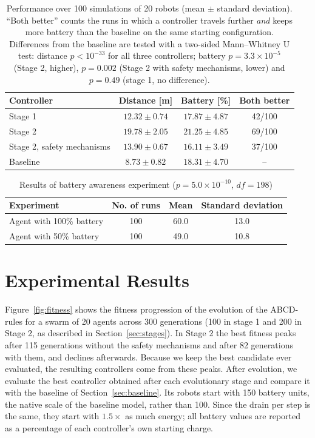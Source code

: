\documentclass[runningheads]{llncs}
\begin{document}
\begin{table}[t]
\centering
\caption{Performance over 100 simulations of 20 robots (mean $\pm$ standard deviation). ``Both better'' counts the runs in which a controller travels further \emph{and} keeps more battery than the baseline on the same starting configuration. Differences from the baseline are tested with a two-sided Mann--Whitney U test: distance $p < 10^{-33}$ for all three controllers; battery $p = 3.3\times10^{-5}$ (Stage 2, higher), $p = 0.002$ (Stage 2 with safety mechanisms, lower) and $p = 0.49$ (stage 1, no difference).}
\label{tab:results_main}
{
\begin{tabular}{lccc}
\toprule
\textbf{Controller} & \textbf{Distance [m]} & \textbf{Battery [\%]} & \textbf{Both better} \\
\midrule
Stage 1 & $12.32 \pm 0.74$ & $17.87 \pm 4.87$ & 42/100 \\
Stage 2 & $19.78 \pm 2.05$ & $21.25 \pm 4.85$ & 69/100 \\
Stage 2, safety mechanisms & $13.90 \pm 0.67$ & $16.11 \pm 3.49$ & 37/100 \\
Baseline & $8.73 \pm 0.82$ & $18.31 \pm 4.70$ & -- \\
\bottomrule
\end{tabular}}
\end{table}


\begin{table}[t]
\centering
\caption{Results of battery awareness experiment ($p=5.0\times10^{-10}$, $df=198$)}
\begin{tabular}{lccc}
\toprule
\textbf{Experiment} & \textbf{No. of runs} & \textbf{Mean} & \textbf{Standard deviation} \\
\midrule
Agent with 100\% battery & 100 & 60.0 & 13.0 \\
Agent with 50\% battery & 100 & 49.0 & 10.8 \\
\bottomrule
\end{tabular}
\label{tab:results_batt_aware}
\end{table}


\section{Experimental Results}
\label{sec:Exp:Results}

Figure~\ref{fig:fitness} shows the fitness progression of the evolution of the ABCD-rules for a swarm of 20 agents across 300 generations (100 in stage 1 and 200 in Stage 2, as described in Section~\ref{sec:stages}). In Stage 2 the best fitness peaks after 115 generations without the safety mechanisms and after 82 generations with them, and declines afterwards. Because we keep the best candidate ever evaluated, the resulting controllers come from these peaks. After evolution, we evaluate the best controller obtained after each evolutionary stage and compare it with the baseline of Section~\ref{sec:baseline}. Its robots start with 150 battery units, the native scale of the baseline model, rather than 100. Since the drain per step is the same, they start with $1.5\times$ as much energy; all battery values are reported as a percentage of each controller's own starting charge.
\end{document}
